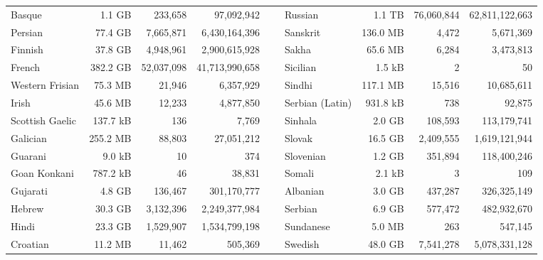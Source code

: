 \begin{table}[ht!]
{\begin{tabular}{lrrrclrrr}
            Basque                      & 1.1 GB    & 233,658     & 97,092,942      & ~ & Russian           & 1.1 TB    & 76,060,844 & 62,811,122,663 \\
            Persian                     & 77.4 GB   & 7,665,871   & 6,430,164,396   & ~ & Sanskrit          & 136.0 MB  & 4,472      & 5,671,369      \\
            Finnish                     & 37.8 GB   & 4,948,961   & 2,900,615,928   & ~ & Sakha             & 65.6 MB   & 6,284      & 3,473,813      \\
            French                      & 382.2 GB  & 52,037,098  & 41,713,990,658  & ~ & Sicilian          & 1.5 kB    & 2          & 50             \\
            Western Frisian             & 75.3 MB   & 21,946      & 6,357,929       & ~ & Sindhi            & 117.1 MB  & 15,516     & 10,685,611     \\
            Irish                       & 45.6 MB   & 12,233      & 4,877,850       & ~ & Serbian (Latin)   & 931.8 kB  & 738        & 92,875         \\
            Scottish Gaelic             & 137.7 kB  & 136         & 7,769           & ~ & Sinhala           & 2.0 GB    & 108,593    & 113,179,741    \\
            Galician                    & 255.2 MB  & 88,803      & 27,051,212      & ~ & Slovak            & 16.5 GB   & 2,409,555  & 1,619,121,944  \\
            Guarani                     & 9.0 kB    & 10          & 374             & ~ & Slovenian         & 1.2 GB    & 351,894    & 118,400,246    \\
            Goan Konkani                & 787.2 kB  & 46          & 38,831          & ~ & Somali            & 2.1 kB    & 3          & 109            \\
            Gujarati                    & 4.8 GB    & 136,467     & 301,170,777     & ~ & Albanian          & 3.0 GB    & 437,287    & 326,325,149    \\
            Hebrew                      & 30.3 GB   & 3,132,396   & 2,249,377,984   & ~ & Serbian           & 6.9 GB    & 577,472    & 482,932,670    \\
            Hindi                       & 23.3 GB   & 1,529,907   & 1,534,799,198   & ~ & Sundanese         & 5.0 MB    & 263        & 547,145        \\
            Croatian                    & 11.2 MB   & 11,462      & 505,369         & ~ & Swedish           & 48.0 GB   & 7,541,278  & 5,078,331,128  \\

\end{tabular}}
\end{table}
